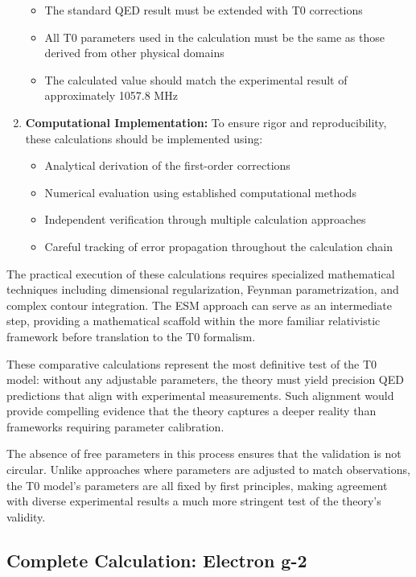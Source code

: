 \documentclass[12pt,a4paper]{article}
\begin{document}
\begin{enumerate}
		\begin{itemize}
			\item The standard QED result must be extended with T0 corrections
			\item All T0 parameters used in the calculation must be the same as those derived from other physical domains
			\item The calculated value should match the experimental result of approximately 1057.8 MHz
		\end{itemize}
		
		\item \textbf{Computational Implementation:} To ensure rigor and reproducibility, these calculations should be implemented using:
		
		\begin{itemize}
			\item Analytical derivation of the first-order corrections
			\item Numerical evaluation using established computational methods
			\item Independent verification through multiple calculation approaches
			\item Careful tracking of error propagation throughout the calculation chain
		\end{itemize}
	\end{enumerate}
	
	The practical execution of these calculations requires specialized mathematical techniques including dimensional regularization, Feynman parametrization, and complex contour integration. The ESM approach can serve as an intermediate step, providing a mathematical scaffold within the more familiar relativistic framework before translation to the T0 formalism.
	
	These comparative calculations represent the most definitive test of the T0 model: without any adjustable parameters, the theory must yield precision QED predictions that align with experimental measurements. Such alignment would provide compelling evidence that the theory captures a deeper reality than frameworks requiring parameter calibration.
	
	The absence of free parameters in this process ensures that the validation is not circular. Unlike approaches where parameters are adjusted to match observations, the T0 model's parameters are all fixed by first principles, making agreement with diverse experimental results a much more stringent test of the theory's validity.
	
	\subsection{Complete Calculation: Electron g-2}
	\label{subsec:complete_calculation}
	
\end{document}
